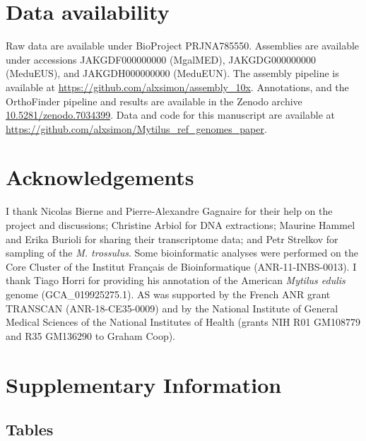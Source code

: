 \documentclass[11pt, a4paper]{article}
\begin{document}
\section*{Data availability}

Raw data are available under BioProject PRJNA785550.
Assemblies are available under accessions JAKGDF000000000 (MgalMED), JAKGDG000000000 (MeduEUS), and JAKGDH000000000 (MeduEUN).
The assembly pipeline is available at \url{https://github.com/alxsimon/assembly_10x}.
Annotations, and the OrthoFinder pipeline and results are available in the Zenodo archive \href{https://doi.org/10.5281/zenodo.7034399}{10.5281/zenodo.7034399}.
Data and code for this manuscript are available at \url{https://github.com/alxsimon/Mytilus_ref_genomes_paper}.

\section*{Acknowledgements}

I thank Nicolas Bierne and Pierre-Alexandre Gagnaire for their help on the project and discussions;
Christine Arbiol for DNA extractions;
Maurine Hammel and Erika Burioli for sharing their transcriptome data;
and Petr Strelkov for sampling of the \textit{M. trossulus}.
Some bioinformatic analyses were performed on the Core Cluster of the Institut Français de Bioinformatique (ANR-11-INBS-0013).
I thank Tiago Horri for providing his annotation of the American \textit{Mytilus edulis} genome (GCA\_019925275.1).
AS was supported by the French ANR grant TRANSCAN (ANR-18-CE35-0009) and by the National Institute of General Medical Sciences of the National Institutes of Health (grants NIH R01 GM108779 and R35 GM136290 to Graham Coop).

\printbibliography

\newpage
\appendix
\setcounter{table}{0}
\renewcommand{\thetable}{S\arabic{table}}
\setcounter{figure}{0}
\renewcommand{\thefigure}{S\arabic{figure}}
\section*{Supplementary Information}

\subsection*{Tables}
\end{document}
